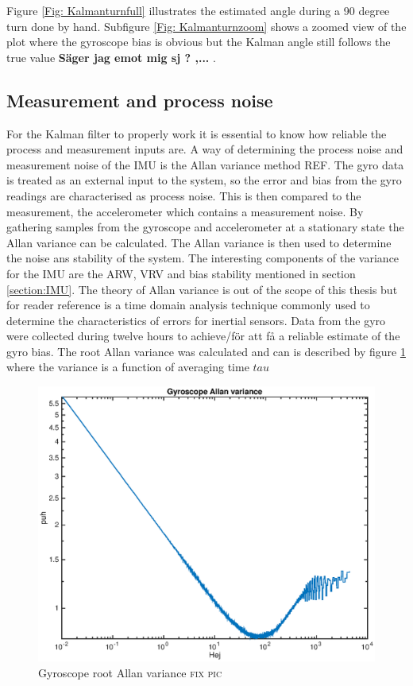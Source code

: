 \documentclass[a4paper,11pt]{kth-mag}
\begin{document}
Figure \ref{Fig: Kalmanturnfull} illustrates the estimated angle during a 90 degree turn done by hand. Subfigure \ref{Fig: Kalmanturnzoom} shows a zoomed view of the plot where the gyroscope bias is obvious but the Kalman angle still follows the true value \textbf{Säger jag emot mig sj ? ,...} .



\subsection{Measurement and process noise} \label{chapter:Allan Variance}
For the Kalman filter to properly work it is essential to know how reliable the process and measurement inputs are. A way of determining the process noise and measurement noise of the IMU is the Allan variance method \textsc{REF}.
The gyro data is treated as an external input to the system, so the error and bias from the gyro readings are characterised as process noise. This is then compared to the measurement, the accelerometer which contains a measurement noise.
By gathering samples from the gyroscope and accelerometer at a stationary state the Allan variance can be calculated. The Allan variance is then used to determine the noise ans stability of the system. The interesting components of the variance for the IMU are the ARW, VRV and bias stability mentioned in section \ref{section:IMU}. The theory of Allan variance is out of the scope of this thesis but for reader reference is a time domain analysis technique commonly used to determine the characteristics of errors for inertial sensors\cite{Allancalibration}.
Data from the gyro were collected during twelve hours to achieve/för att få a reliable estimate of the gyro bias. 
The root Allan variance was calculated and can is described by figure \ref{fig:gyroscope allan} where the variance is a function of averaging time $tau$

\begin{figure}[!htb]
\centering
\includegraphics[scale=.7]{gyroscopeallan.eps}
\caption{Gyroscope root Allan variance \textsc{fix pic}}
\label{fig:gyroscope allan}
\end{figure}
\end{document}

